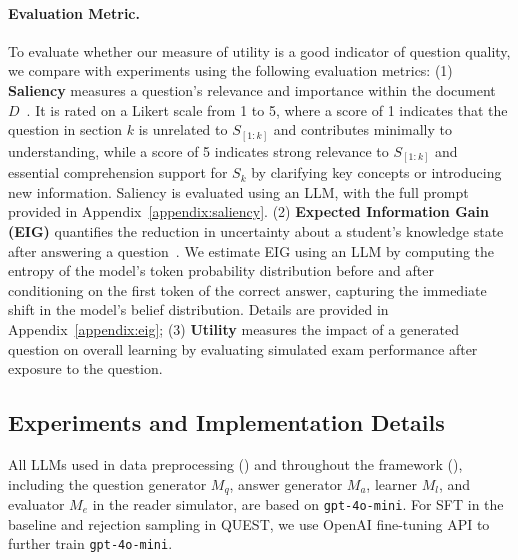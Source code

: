 \paragraph{Evaluation Metric.}
To evaluate whether our measure of utility is a good indicator of question quality, we compare with experiments using the following evaluation metrics:
(1) \textbf{Saliency} measures a question’s relevance and importance within the document \( D \)~\cite{wu2024questions}.
It is rated on a Likert scale from 1 to 5, where a score of 1 indicates that the question in section \( k \) is unrelated to \( S_{[1:k]} \) and contributes minimally to understanding, while a score of 5 indicates strong relevance to \( S_{[1:k]} \) and essential comprehension support for \( S_k \) by clarifying key concepts or introducing new information.
Saliency is evaluated using an LLM, with the full prompt provided in Appendix~\ref{appendix:saliency}.
(2) \textbf{Expected Information Gain (EIG)} quantifies the reduction in uncertainty about a student's knowledge state after answering a question~\cite{lindley1956measure, schaeffer2003science, rao-daume-iii-2018-learning, yu-etal-2020-interactive, white-etal-2021-open, keh-etal-2024-asking}.
We estimate EIG using an LLM by computing the entropy of the model’s token probability distribution before and after conditioning on the first token of the correct answer, capturing the immediate shift in the model’s belief distribution.
Details are provided in Appendix~\ref{appendix:eig};
(3) \textbf{Utility} measures the impact of a generated question on overall learning by evaluating simulated exam performance after exposure to the question.

\subsection{Experiments and Implementation Details}  
All LLMs used in data preprocessing () and throughout the framework (), including the question generator \( M_q \), answer generator \( M_a \), learner \( M_l \), and evaluator \( M_e \) in the reader simulator, are based on \texttt{gpt-4o-mini}.
For SFT in the baseline and rejection sampling in \textsc{QUEST}, we use OpenAI fine-tuning API to further train \texttt{gpt-4o-mini}.






